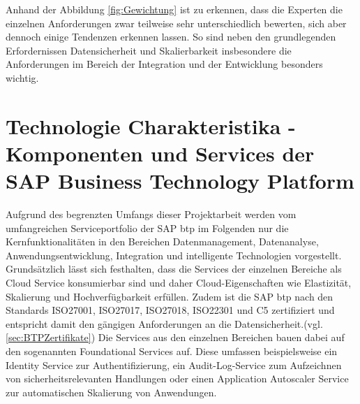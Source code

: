 Anhand der Abbildung \ref{fig:Gewichtung} ist zu erkennen, dass die Experten die einzelnen Anforderungen zwar teilweise sehr unterschiedlich bewerten, sich aber dennoch einige Tendenzen erkennen lassen. So sind neben den grundlegenden Erfordernissen Datensicherheit und Skalierbarkeit insbesondere die Anforderungen im Bereich der Integration und der Entwicklung besonders wichtig. 










\section{Technologie Charakteristika - Komponenten und Services der SAP Business Technology Platform}\label{sec:TechCharak}

Aufgrund des begrenzten Umfangs dieser Projektarbeit werden vom umfangreichen Serviceportfolio der SAP \ac{btp} im Folgenden nur die Kernfunktionalitäten in den Bereichen Datenmanagement, Datenanalyse, Anwendungsentwicklung, Integration und intelligente Technologien vorgestellt. Grundsätzlich lässt sich festhalten, dass die Services der einzelnen Bereiche als Cloud Service konsumierbar sind und daher Cloud-Eigenschaften wie Elastizität, Skalierung und Hochverfügbarkeit erfüllen. \autocite[Vgl.][S. 60]{SEUBERT} Zudem ist die SAP \ac{btp} nach den Standards ISO27001, ISO27017, ISO27018, ISO22301 und C5 zertifiziert und entspricht damit den gängigen Anforderungen an die Datensicherheit.(vgl. \ref{sec:BTPZertifikate}) Die Services aus den einzelnen Bereichen bauen dabei auf den sogenannten Foundational Services auf. Diese umfassen beispielsweise ein Identity Service zur Authentifizierung, ein Audit-Log-Service zum Aufzeichnen von sicherheitsrelevanten Handlungen oder einen Application Autoscaler Service zur automatischen Skalierung von Anwendungen. \autocite[Vgl.][S. 58]{SEUBERT}


